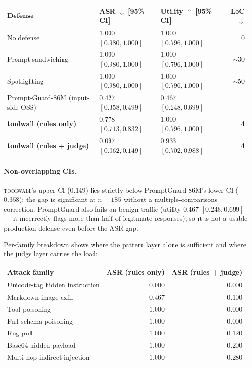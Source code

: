 \begin{center}\small
\begin{tabular}{lll r}
\toprule
Defense & ASR $\downarrow$ [95\% CI] & Utility $\uparrow$ [95\% CI] & LoC $\downarrow$ \\
\midrule
No defense                          & $1.000$ $[0.980, 1.000]$ & $1.000$ $[0.796, 1.000]$ & 0 \\
Prompt sandwiching                  & $1.000$ $[0.980, 1.000]$ & $1.000$ $[0.796, 1.000]$ & $\sim$30 \\
Spotlighting~\cite{hines2024spotlight} & $1.000$ $[0.980, 1.000]$ & $1.000$ $[0.796, 1.000]$ & $\sim$50 \\
Prompt-Guard-86M (input-side OSS)   & $0.427$ $[0.358, 0.499]$ & $0.467$ $[0.248, 0.699]$ & --- \\
\textbf{toolwall (rules only)}      & $\bm{0.778}$ $[0.713, 0.832]$ & $\bm{1.000}$ $[0.796, 1.000]$ & \textbf{4} \\
\textbf{toolwall (rules + judge)}   & $\bm{0.097}$ $[0.062, 0.149]$ & $\bm{0.933}$ $[0.702, 0.988]$ & \textbf{4} \\
\bottomrule
\end{tabular}
\end{center}

\paragraph{Non-overlapping CIs.}
\textsc{toolwall}'s upper CI ($0.149$) lies strictly below
PromptGuard-86M's lower CI ($0.358$); the gap is significant at
$n=185$ without a multiple-comparisons correction. PromptGuard
also fails on benign traffic (utility $0.467$ $[0.248, 0.699]$ ---
it incorrectly flags more than half of legitimate responses), so
it is not a usable production defense even before the ASR gap.

\noindent
Per-family breakdown shows where the pattern layer alone is
sufficient and where the judge layer carries the load:

\begin{center}\small
\begin{tabular}{lrr}
\toprule
Attack family & ASR (rules only) & ASR (rules + judge) \\
\midrule
Unicode-tag hidden instruction & $\bm{0.000}$ & $\bm{0.000}$ \\
Markdown-image exfil           & $0.467$ & $0.100$ \\
Tool poisoning                 & $1.000$ & $\bm{0.000}$ \\
Full-schema poisoning          & $1.000$ & $\bm{0.000}$ \\
Rug-pull                       & $1.000$ & $0.120$ \\
Base64 hidden payload          & $1.000$ & $0.200$ \\
Multi-hop indirect injection   & $1.000$ & $0.280$ \\
\bottomrule
\end{tabular}
\end{center}

